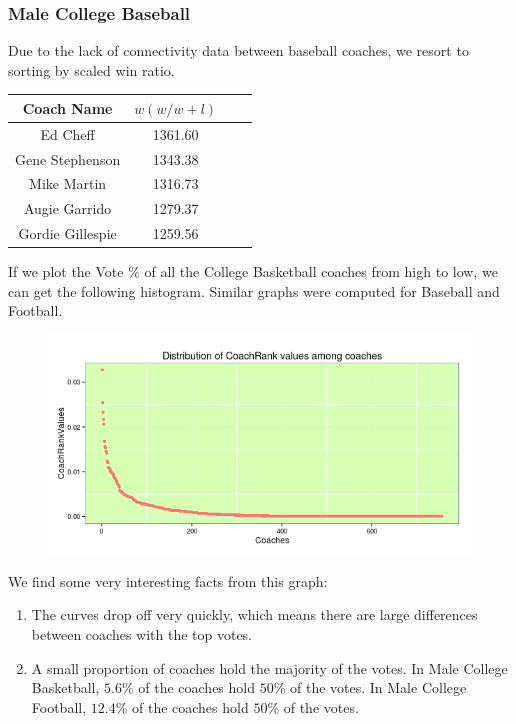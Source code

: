 \documentclass[11pt,notitlepage]{article}
\begin{document}
\subsubsection*{Male College Baseball}

Due to the lack of connectivity data between baseball coaches, we resort to sorting by scaled win ratio.
\begin{center}
\begin{tabular}{ | c | c | c| c | }
\hline
Coach Name       & $w (w / w + l)$ \\\hline
Ed Cheff         & 1361.60 \\\hline
Gene Stephenson  & 1343.38 \\\hline
Mike Martin      & 1316.73 \\\hline
Augie Garrido    & 1279.37 \\\hline
Gordie Gillespie & 1259.56 \\
\hline
\end{tabular}
\end{center}

\noindent If we plot the Vote \% of all the College Basketball coaches from high to low, we can get the following histogram. Similar graphs were computed for Baseball and Football.

\begin{figure}[H]
      \centering
      \includegraphics[width=1\textwidth]{graphs/basketball_score_dist.png}
 \end{figure}

\noindent We find some very interesting facts from this graph:

\begin{enumerate}
\item The curves drop off very quickly, which means there are large differences between coaches with the top votes.
\item A small proportion of coaches hold the majority of the votes. In Male College Basketball, $5.6\%$ of the coaches hold $50\%$ of the votes. In Male College Football, $12.4\%$ of the coaches hold $50\%$ of the votes.
\end{enumerate}
\end{document}
